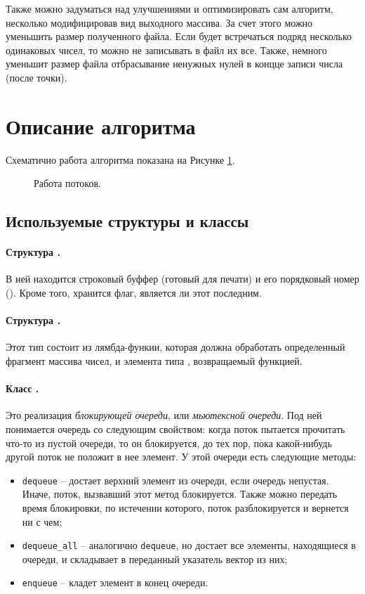 \documentclass[specialist,subf,href,colorlinks=true,14pt
,times,mtpro,specialist
]{disser}
\begin{document}
Также можно задуматься над улучшениями и оптимизировать сам алгоритм, несколько модифицировав вид выходного массива.
За счет этого можно уменьшить размер полученного файла.
Если будет встречаться подряд несколько одинаковых чисел, то можно не записывать в файл их все.
Также, немного уменьшит размер файла отбрасывание ненужных нулей в концце записи числа (после точки).


\section{Описание алгоритма}
Схематично работа алгоритма показана на Рисунке \ref{draw}.
\begin{figure}[h!]
\begin{footnotesize}
\def\svgwidth{430pt}
  
  \caption{Работа потоков.} \label{draw}
\end{footnotesize}\end{figure}

\subsection{Используемые структуры и классы}
\paragraph{Структура \texttt{}.}
В ней находится строковый буффер (готовый для печати) и его порядковый номер (\texttt{}).
Кроме того, хранится флаг, является ли этот \texttt{} последним.
\paragraph{Структура \texttt{}.}
Этот тип состоит из лямбда-функии, которая должна обработать определенный фрагмент массива чисел, и элемента типа \texttt{}, возвращаемый функцией.
\paragraph{Класс \texttt{}.}
Это реализация \textit{блокирующей очереди}, или \textit{мьютексной очереди}.  
Под ней понимается очередь со следующим свойством: когда поток пытается прочитать что-то из пустой очереди, то он блокируется, до тех пор, пока какой-нибудь другой поток не положит в нее элемент.
У этой очереди есть следующие методы:
\begin{itemize}
\item \texttt{dequeue} -- достает верхний элемент из очереди, если очередь непустая.
Иначе, поток, вызвавший этот метод блокируется. Также можно передать время блокировки, по истечении которого, поток разблокируется и вернется ни с чем;
\item \texttt{dequeue\_all} -- аналогично \texttt{dequeue}, но достает все элементы, находящиеся в очереди, и складывает в переданный указатель вектор из них;
\item \texttt{enqueue} -- кладет элемент в конец очереди.
\end{itemize}
\end{document}
